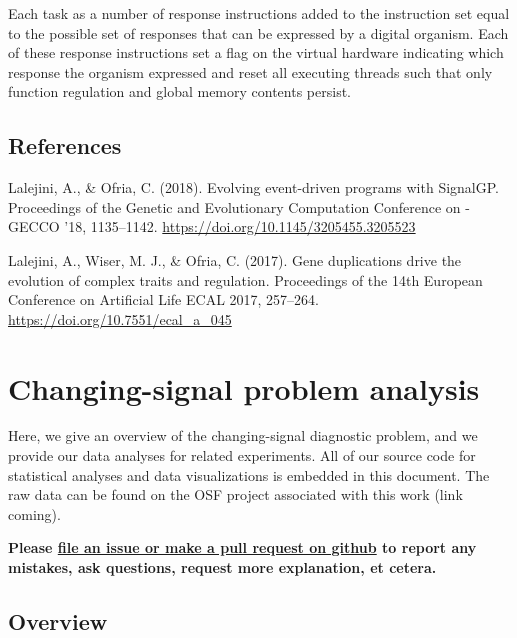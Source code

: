 \documentclass[
]{book}
\begin{document}
Each task as a number of response instructions added to the instruction set equal to the possible set
of responses that can be expressed by a digital organism. Each of these response instructions set a
flag on the virtual hardware indicating which response the organism expressed and reset all executing
threads such that only function regulation and global memory contents persist.

\hypertarget{references}{%
\section{References}\label{references}}

Lalejini, A., \& Ofria, C. (2018). Evolving event-driven programs with SignalGP. Proceedings of the Genetic and Evolutionary Computation Conference on - GECCO '18, 1135--1142. \url{https://doi.org/10.1145/3205455.3205523}

Lalejini, A., Wiser, M. J., \& Ofria, C. (2017). Gene duplications drive the evolution of complex traits and regulation. Proceedings of the 14th European Conference on Artificial Life ECAL 2017, 257--264. \url{https://doi.org/10.7551/ecal_a_045}

\hypertarget{changing-signal-problem-analysis}{%
\chapter{Changing-signal problem analysis}\label{changing-signal-problem-analysis}}

Here, we give an overview of the changing-signal diagnostic problem, and we provide our data analyses for related experiments.
All of our source code for statistical analyses and data visualizations is embedded in this document.
The raw data can be found on the OSF project associated with this work (link coming).

\textbf{Please \href{https://github.com/amlalejini/Tag-based-Genetic-Regulation-for-LinearGP/issues}{file an issue or make a pull request on github} to report any mistakes, ask questions, request more explanation, et cetera.}

\hypertarget{overview}{%
\section{Overview}\label{overview}}
\end{document}
